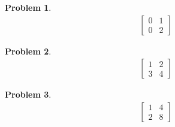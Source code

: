 \documentclass{article}
\newtheorem{problem}{Problem}
\begin{document}
\begin{problem}
\begin{align*}
\begin{bmatrix}
0 & 1 \\ 0 & 2
\end{bmatrix}
\end{align*}
\end{problem}

\begin{problem}
\begin{align*}
\begin{bmatrix}
1 & 2 \\ 3 & 4
\end{bmatrix}
\end{align*}
\end{problem}

\begin{problem}
\begin{align*}
\begin{bmatrix}
1 & 4 \\ 2 & 8
\end{bmatrix}
\end{align*}
\end{problem}
\end{document}
